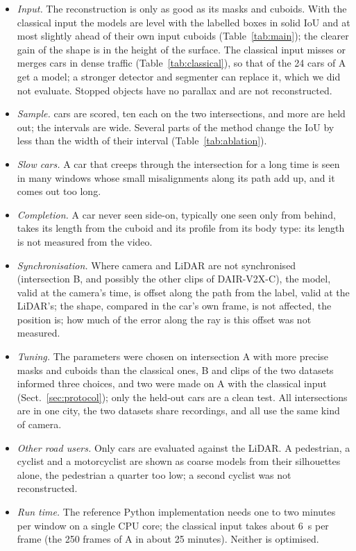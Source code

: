 \documentclass[runningheads,a4paper]{llncs}
\begin{document}
\begin{itemize}
\item \emph{Input.} The reconstruction is only as good as its masks and cuboids. With the classical input the models are level with the labelled boxes in solid IoU and at most slightly ahead of their own input cuboids (Table~\ref{tab:main}); the clearer gain of the shape is in the height of the surface. The classical input misses or merges cars in dense
  traffic (Table~\ref{tab:classical}), so that \ClsACars{} of the 24 cars of A get a model; a stronger detector and
  segmenter can replace it, which we did not evaluate. Stopped objects have no parallax and are not reconstructed.
\item \emph{Sample.} \ClsTCars{} cars are scored, ten each on the two intersections, and \ClsHCars{} more are held out; the intervals are wide. Several parts of the method change the IoU by less than the width of their interval (Table~\ref{tab:ablation}).
\item \emph{Slow cars.} A car that creeps through the intersection for a long time is seen in many windows whose
  small misalignments along its path add up, and it comes out too long.
\item \emph{Completion.} A car never seen side-on, typically one seen only from behind, takes its length from the
  cuboid and its profile from its body type: its length is not measured from the video.
\item \emph{Synchronisation.} Where camera and LiDAR are not synchronised (intersection B, and possibly the other clips of DAIR-V2X-C), the model, valid at the
  camera's time, is offset along the path from the label, valid at the LiDAR's; the shape, compared in the car's own
  frame, is not affected, the position is; how much of the error along the ray is this offset was not measured.
\item \emph{Tuning.} The parameters were chosen on intersection A with more precise masks and cuboids than the
  classical ones, B and clips of the two datasets informed three choices, and two were made on A with the classical
  input (Sect.~\ref{sec:protocol}); only the \ClsHCars{} held-out cars are a clean test. All intersections are in one city, the two datasets
  share recordings, and all use the same kind of camera.
\item \emph{Other road users.} Only cars are evaluated against the LiDAR. A pedestrian, a cyclist and a motorcyclist are shown as coarse models from their silhouettes alone, the pedestrian a quarter too low; a second cyclist was not reconstructed.
\item \emph{Run time.} The reference Python implementation needs one to two minutes per window on a single CPU core;
  the classical input takes about 6~s per frame (the 250 frames of A in
  about 25 minutes). Neither is optimised.
\end{itemize}
\end{document}
